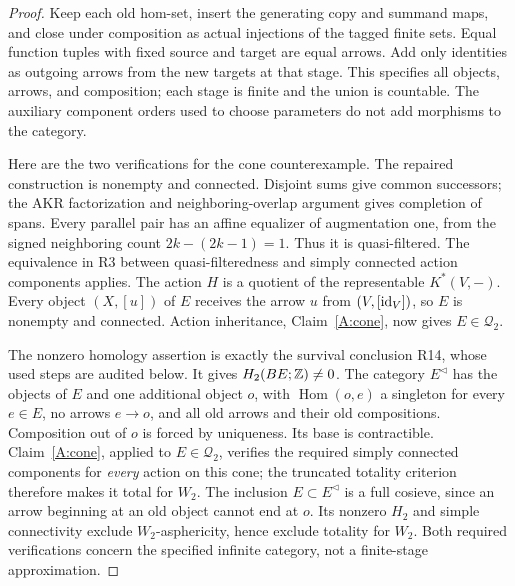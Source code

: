 \begin{proof}
Keep each old hom-set, insert the generating copy and summand maps, and close under composition as actual injections of the tagged finite sets. Equal function tuples with fixed source and target are equal arrows. Add only identities as outgoing arrows from the new targets at that stage. This specifies all objects, arrows, and composition; each stage is finite and the union is countable. The auxiliary component orders used to choose parameters do not add morphisms to the category.

Here are the two verifications for the cone counterexample. The repaired construction is nonempty and connected. Disjoint sums give common successors; the AKR factorization and neighboring-overlap argument gives completion of spans. Every parallel pair has an affine equalizer of augmentation one, from the signed neighboring count $2k-(2k-1)=1$. Thus it is quasi-filtered. The equivalence in R3 between quasi-filteredness and simply connected action components applies. The action $H$ is a quotient of the representable $K^*(V,-)$. Every object $(X,[u])$ of $E$ receives the arrow $u$ from $(V,[\mathrm{id}_V])$, so $E$ is nonempty and connected. Action inheritance, Claim~\ref{A:cone}, now gives $E\in\mathcal Q_2$.

The nonzero homology assertion is exactly the survival conclusion R14, whose used steps are audited below. It gives $H_2(BE;\mathbb Z)\ne0$. The category $E^{\triangleleft}$ has the objects of $E$ and one additional object $o$, with $\operatorname{Hom}(o,e)$ a singleton for every $e\in E$, no arrows $e\to o$, and all old arrows and their old compositions. Composition out of $o$ is forced by uniqueness. Its base is contractible. Claim~\ref{A:cone}, applied to $E\in\mathcal Q_2$, verifies the required simply connected components for \emph{every} action on this cone; the truncated totality criterion therefore makes it total for $W_2$. The inclusion $E\subset E^{\triangleleft}$ is a full cosieve, since an arrow beginning at an old object cannot end at $o$. Its nonzero $H_2$ and simple connectivity exclude $W_2$-asphericity, hence exclude totality for $W_2$. Both required verifications concern the specified infinite category, not a finite-stage approximation.
\end{proof}


